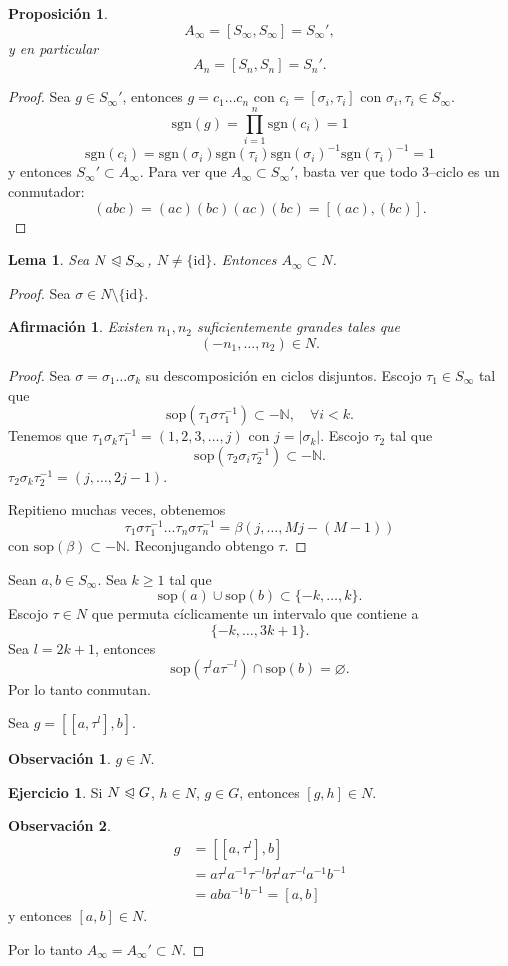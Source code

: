 \documentclass{article}
\newtheorem{claim}{Afirmación}
\newtheorem{proposition}[theorem]{Proposición}
\newtheorem{lemma}[theorem]{Lema}
\theoremstyle{definition}
\newtheorem{exercise}{Ejercicio}
\newtheorem*{obs}{Observación}
\theoremstyle{remark}
\numberwithin{equation}{section}
\newcommand{\N}{\mathbb{N}}
\newcommand{\oo}{\infty}
\newcommand{\normal}{\trianglelefteqslant}
\newcommand{\sgn}{\mathrm{sgn}}
\newcommand{\id}{\mathrm{id}}
\newcommand{\sop}{\mathrm{sop}}
\newcommand{\abs}[1]{\left| #1 \right|}
\begin{document}
\begin{proposition}
  $$A_\oo = [S_\oo,S_\oo] = S_\oo',$$
  y en particular
  $$A_n = [S_n, S_n] = S_n'.$$
\end{proposition}
\begin{proof}
  Sea $g \in S_\oo'$, entonces $g = c_1 \dots c_n$ con $c_i = [\sigma_i, \tau_i]$ con $\sigma_i, \tau_i \in S_\oo$.
  \[\sgn(g) = \prod_{i=1}^n \sgn(c_i) = 1\]
  \[\sgn(c_i) = \sgn(\sigma_i) \sgn(\tau_i) \sgn(\sigma_i)^{-1} \sgn(\tau_i)^{-1} = 1\]
  y entonces $S_\oo' \subset A_\oo$.
  Para ver  que $A_\oo \subset S_\oo'$, basta ver que todo 3--ciclo es un conmutador:
  \[(abc) = (ac)(bc)(ac)(bc) = [(ac),(bc)].\]
\end{proof}

\begin{lemma}
  Sea $N \normal S_\oo$, $N \neq \{\id\}$. Entonces $A_\oo \subset N$.
\end{lemma}
\begin{proof}
  Sea $\sigma \in N \setminus \{\id\}$.
  \begin{claim}
  Existen $n_1,n_2$ suficientemente grandes tales que
  \[(-n_1, \dots, n_2) \in N.\]
  \end{claim}
  \begin{proof}
    Sea $\sigma = \sigma_1 \dots \sigma_k$ su descomposición en ciclos disjuntos. Escojo $\tau_1 \in S_\oo$ tal que
    \[\sop(\tau_1 \sigma \tau_1^{-1}) \subset - \N, \quad \forall i < k. \tag{$*$}\]
    Tenemos que $\tau_1 \sigma_k \tau_1^{-1} = (1,2,3, \dots, j)$ con $j = \abs{\sigma_k}$.
    Escojo $\tau_2$ tal que
    \[\sop(\tau_2 \sigma_i \tau_2^{-1}) \subset -\N. \tag{$*$}\]
    $\tau_2 \sigma_k \tau_2^{-1} = (j,\dots, 2j-1)$.

    Repitieno muchas veces, obtenemos
    \[\tau_1 \sigma \tau_1^{-1} \dots \tau_n \sigma \tau_n^{-1} = \beta(j,\dots, Mj - (M - 1))\]
    con $\sop(\beta) \subset -\N$. Reconjugando obtengo $\tau$.
  \end{proof}
  Sean $a,b \in S_\oo$. Sea $k \geq 1$ tal que
  \[\sop(a) \cup \sop(b) \subset \{-k,\dots,k\}.\]
  Escojo $\tau \in N$ que permuta cíclicamente un intervalo que contiene a $$\{-k,\dots,3k+1\}.$$
  Sea $l = 2k+1$, entonces
  \[\sop(\tau^l a \tau^{-l}) \cap \sop(b) = \varnothing.\]
  Por lo tanto conmutan.

  Sea $g = [[a,\tau^l],b]$.
  \begin{obs}
    $g \in N$.
  \end{obs}
  \begin{exercise}
    Si $N \normal G$, $h \in N$, $g \in G$, entonces $[g,h] \in N$.
  \end{exercise}
  \begin{obs}
    \begin{align*}
      g &= [[a,\tau^l], b] \\
      &= a \tau^l a^{-1} \tau^{-l} b \tau^l a \tau^{-l} a^{-1} b^{-1} \\
      &= aba^{-1}b^{-1} = [a,b]
    \end{align*}
    y entonces $[a,b] \in N$.
  \end{obs}
  Por lo tanto $A_\oo = A_\oo' \subset N$.
\end{proof}
\end{document}
